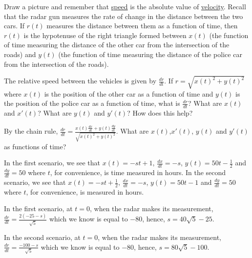 \documentclass{ximera}
\begin{document}
\begin{exercise}
\begin{hint}
Draw a picture and remember that \underline{speed} is the absolute value of \underline{velocity}. Recall that the radar gun measures the rate of change in the distance between the two cars. If $r(t)$ measures the distance between them as a function of time, then $r(t)$ is the hypotenuse of the right triangle formed between $x(t)$ (the function of time measuring the distance of the other car from the intersection of the roads) and $y(t)$ (the function of time measuring the distance of the police car from the intersection of the roads). 
\end{hint}
\begin{hint}
The relative speed between the vehicles is given by $\frac{dr}{dt}$. If $r=\sqrt{x(t)^2+y(t)^2}$ where $x(t)$ is the position of the other car as a function of time and $y(t)$ is the position of the police car as a function of time, what is $\frac{dr}{dt}$? What are $x(t)$ and $x'(t)$? What are $y(t)$ and $y'(t)$? How does this help? 
\end{hint}
\begin{hint}
By the chain rule, $\frac{dr}{dt}=\frac{x(t)\frac{dx}{dt}+y(t)\frac{dy}{dt}}{\sqrt{x(t)^2+y(t)^2}}$. What are $x(t)$,$x'(t)$, $y(t)$ and $y'(t)$ as functions of time?
\end{hint}
\begin{hint}
In the first scenario, we see that $x(t)=-st+1$, $\frac{dx}{dt}=-s$, $y(t)=50t-\frac{1}{2}$ and $\frac{dy}{dt}=50$ where $t$, for convenience, is time measured in hours. In the second scenario, we see that $x(t)=-st+\frac{1}{2}$, $\frac{dx}{dt}=-s$, $y(t)=50t-1$ and $\frac{dy}{dt}=50$ where $t$, for convenience, is measured in hours.
\end{hint}
\begin{hint}
In the first scenario, at $t=0$, when the radar makes its measurement, $\frac{dr}{dt}=\frac{2(-25-s)}{\sqrt{5}}$ which we know is equal to $-80$, hence, $s=40\sqrt{5}-25$.

In the second scenario, at $t=0$, when the radar makes its measurement, $\frac{dr}{dt}=\frac{-100-s}{\sqrt{5}}$ which we know is equal to $-80$, hence, $s=80\sqrt{5}-100$.
\end{hint}
\end{exercise}
\end{document}
